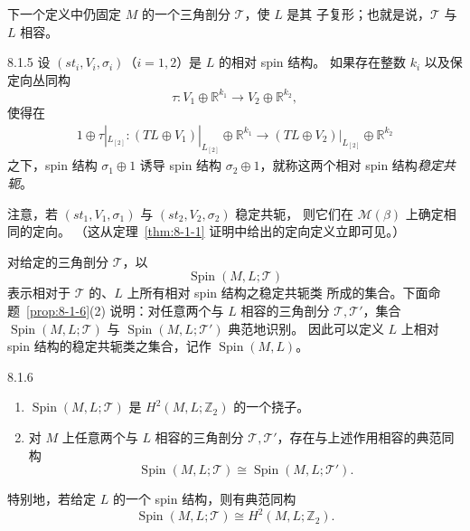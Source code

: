 下一个定义中仍固定 $M$ 的一个三角剖分 $\mathcal T$，使 $L$ 是其
子复形；也就是说，$\mathcal T$ 与 $L$ 相容。

\begin{definition}{8.1.5}\label{def:8-1-5}
设 $(st_i,V_i,\sigma_i)$（$i=1,2$）是 $L$ 的相对 spin 结构。
如果存在整数 $k_i$ 以及保定向丛同构
\[
\tau\colon V_1\oplus\mathbb R^{k_1}
\longrightarrow V_2\oplus\mathbb R^{k_2},
\]
使得在
\[
\begin{split}
1\oplus\tau|_{L_{[2]}}\colon
(TL\oplus V_1)|_{L_{[2]}}\oplus\mathbb R^{k_1}
\longrightarrow
(TL\oplus V_2)|_{L_{[2]}}\oplus\mathbb R^{k_2}
\end{split}
\]
之下，spin 结构 $\sigma_1\oplus1$ 诱导 spin 结构
$\sigma_2\oplus1$，就称这两个相对 spin 结构\emph{稳定共轭}。
\end{definition}

注意，若 $(st_1,V_1,\sigma_1)$ 与 $(st_2,V_2,\sigma_2)$ 稳定共轭，
则它们在 $\mathcal M(\beta)$ 上确定相同的定向。
（这从定理~\ref{thm:8-1-1} 证明中给出的定向定义立即可见。）

对给定的三角剖分 $\mathcal T$，以
\[
\operatorname{Spin}(M,L;\mathcal T)
\]
表示相对于 $\mathcal T$ 的、$L$ 上所有相对 spin 结构之稳定共轭类
所成的集合。下面命题~\ref{prop:8-1-6}(2) 说明：对任意两个与 $L$
相容的三角剖分 $\mathcal T,\mathcal T'$，集合
$\operatorname{Spin}(M,L;\mathcal T)$ 与
$\operatorname{Spin}(M,L;\mathcal T')$ 典范地识别。
因此可以定义 $L$ 上相对 spin 结构的稳定共轭类之集合，记作
$\operatorname{Spin}(M,L)$。

\begin{proposition}{8.1.6}\label{prop:8-1-6}
\begin{enumerate}[label=(\arabic*),leftmargin=2.8em]
\item $\operatorname{Spin}(M,L;\mathcal T)$ 是
$H^2(M,L;\mathbb Z_2)$ 的一个挠子。

\item 对 $M$ 上任意两个与 $L$ 相容的三角剖分
$\mathcal T,\mathcal T'$，存在与上述作用相容的典范同构
\[
\operatorname{Spin}(M,L;\mathcal T)
\cong\operatorname{Spin}(M,L;\mathcal T').
\]
\end{enumerate}
\end{proposition}

特别地，若给定 $L$ 的一个 spin 结构，则有典范同构
\[
\operatorname{Spin}(M,L;\mathcal T)
\cong H^2(M,L;\mathbb Z_2).
\]

